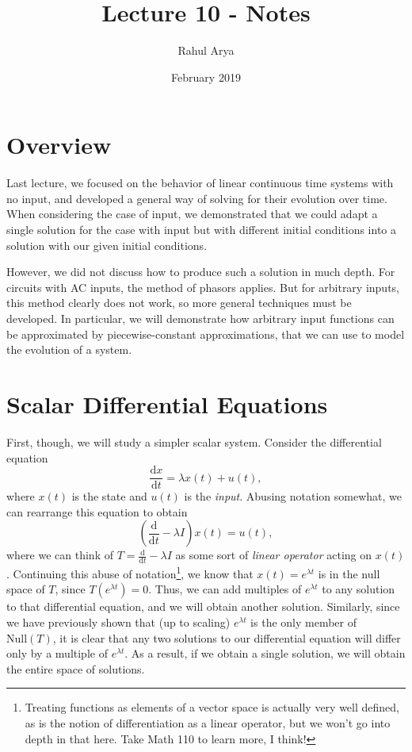 \documentclass[letterpaper]{article}
\title{Lecture 10 - Notes}
\author{Rahul Arya}
\date{February 2019}
\theoremstyle{remark}
\newcommand{\dx}{\mathrm{d}x}
\newcommand{\dt}{\mathrm{d}t}
\newcommand{\diff}{\mathrm{d}}
\begin{document}
\maketitle

\section{Overview}
Last lecture, we focused on the behavior of linear continuous time systems with no input, and developed a general way of solving for their evolution over time. When considering the case of input, we demonstrated that we could adapt a single solution for the case with input but with different initial conditions into a solution with our given initial conditions.

However, we did not discuss how to produce such a solution in much depth. For circuits with AC inputs, the method of phasors applies. But for arbitrary inputs, this method clearly does not work, so more general techniques must be developed. In particular, we will demonstrate how arbitrary input functions can be approximated by piecewise-constant approximations, that we can use to model the evolution of a system.

\section{Scalar Differential Equations}
First, though, we will study a simpler scalar system. Consider the differential equation
\[
    \frac{\dx}{\dt} = \lambda x(t) + u(t),
\]
where $x(t)$ is the state and $u(t)$ is the \emph{input}. Abusing notation somewhat, we can rearrange this equation to obtain
\[
    \left(\frac{\diff}{\dt} - \lambda I\right)x(t) = u(t),
\]
where we can think of $T = \frac{\diff}{\dt} - \lambda I$ as some sort of \emph{linear operator} acting on $x(t)$. Continuing this abuse of notation\footnote{Treating functions as elements of a vector space is actually very well defined, as is the notion of differentiation as a linear operator, but we won't go into depth in that here. Take Math 110 to learn more, I think!}, we know that $x(t) = e^{\lambda t}$ is in the null space of $T$, since $T(e^{\lambda t}) = 0$. Thus, we can add multiples of $e^{\lambda t}$ to any solution to that differential equation, and we will obtain another solution. Similarly, since we have previously shown that (up to scaling) $e^{\lambda t}$ is the only member of $\text{Null}(T)$, it is clear that any two solutions to our differential equation will differ only by a multiple of $e^{\lambda t}$. As a result, if we obtain a single solution, we will obtain the entire space of solutions.
\end{document}
